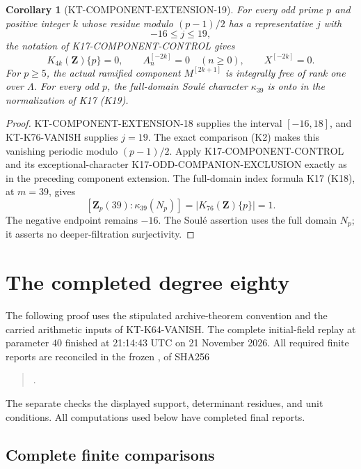 \documentclass[11pt,a4paper]{article}
\newtheorem{corollary}[theorem]{Corollary}
\theoremstyle{definition}
\begin{document}
\begin{corollary}[KT-COMPONENT-EXTENSION-19]
For every odd prime $p$ and positive integer $k$ whose residue
modulo $(p-1)/2$ has a representative $j$ with
\[
                              -16\leq j\leq19,
\]
the notation of K17-COMPONENT-CONTROL gives
\[
 K_{4k}(\mathbf Z)\{p\}=0,\qquad
 A_n^{[-2k]}=0\quad(n\geq0),\qquad X^{[-2k]}=0.
\]
For $p\geq5$, the actual ramified component $M^{[2k+1]}$
is integrally free of rank one over $\Lambda$.
For every odd $p$, the full-domain Soul\'e character
$\kappa_{39}$ is onto in the normalization of K17 (K19).
\end{corollary}
\begin{proof}
KT-COMPONENT-EXTENSION-18 supplies the interval $[-16,18]$,
and KT-K76-VANISH supplies $j=19$.
The exact comparison (K2) makes this vanishing periodic
modulo $(p-1)/2$.  Apply K17-COMPONENT-CONTROL and its
exceptional-character K17-ODD-COMPANION-EXCLUSION exactly
as in the preceding component extension.  The full-domain
index formula K17 (K18), at $m=39$, gives
\[
 [\mathbf Z_p(39):\kappa_{39}(N_p)]
                  =|K_{76}(\mathbf Z)\{p\}|=1.
\]
The negative endpoint remains $-16$.  The Soul\'e assertion
uses the full domain $N_p$; it asserts no deeper-filtration
surjectivity.
\end{proof}



\section{The completed degree eighty}
\label{sec:kt-further-e40}

The following proof uses the stipulated archive-theorem convention
and the carried arithmetic inputs of KT-K64-VANISH.
The complete initial-field replay at parameter $40$ finished at
21:14:43 UTC on 21 November 2026.  All required finite reports
are reconciled in the frozen
, of SHA256
\begin{quote}\small
{}.
\end{quote}
The separate  checks the
displayed support, determinant residues, and unit conditions.
All computations used below have completed final reports.

\subsection{Complete finite comparisons}
\end{document}
